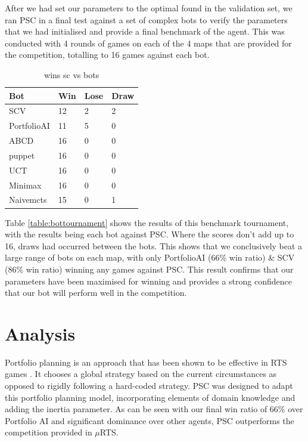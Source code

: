 \documentclass[]{article}
\begin{document}
After we had set our parameters to the optimal found in the validation set, we ran PSC in a final test against a set of complex bots to verify the parameters that we had initialised and provide a final benchmark of the agent. This was conducted with 4 rounds of games on each of the 4 maps that are provided for the competition, totalling to 16 games against each bot.

\begin{table}[]
\caption{wins sc vs bots}
\label{table:bottournament}
\begin{tabular}{llll}
\toprule
Bot       & Win & Lose & Draw\\ \midrule
SCV       & 12  & 2    & 2\\
PortfolioAI & 11  & 5    & 0\\
ABCD    & 16  & 0    & 0  \\
puppet    & 16  & 0    & 0    \\
UCT       & 16  & 0    & 0     \\
Minimax   & 16  & 0    & 0    \\
Naivemcts & 15  & 0    & 1    \\ \bottomrule
\end{tabular}
\label{table:finalbotwins}
\end{table}


Table \ref{table:bottournament} shows the results of this benchmark tournament, with the results being each bot against PSC. Where the scores don't add up to 16, draws had occurred between the bots.
This shows that we conclusively beat a large range of bots on each map, with only PortfolioAI (66\% win ratio) \& SCV (86\% win ratio) winning any games against PSC. This result confirms that our parameters have been maximised for winning and provides a strong confidence that our bot will perform well in the competition.







\section{Analysis}

Portfolio planning is an approach that has been shown to be effective in RTS games \cite{churchill2013portfolio}. It chooses a global strategy based on the current circumstances as opposed to rigidly following a hard-coded strategy. PSC was designed to adapt this portfolio planning model, incorporating elements of domain knowledge and adding the inertia parameter. As can be seen with our final win ratio of 66\% over Portfolio AI and significant dominance over other agents, PSC outperforms the competition provided in $\mu$RTS.
\end{document}
